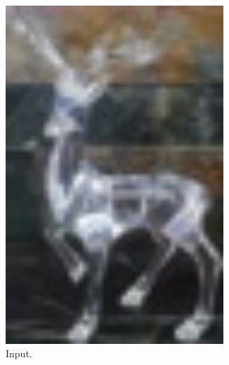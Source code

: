 \documentclass[11pt]{article}
\theoremstyle{definition}
\theoremstyle{remark}
\theoremstyle{remark}
\theoremstyle{remark}
\begin{document}
\begin{figure}[H]
  \centering
  \begin{subfigure}[b]{0.32\textwidth}
    \centering
    \includegraphics[width=0.9\textwidth]{figs/input3.jpg}
    \caption{Input.}
  \end{subfigure}
  \begin{subfigure}[b]{0.32\textwidth}
    \centering

\end{subfigure}
\end{figure}
\end{document}
